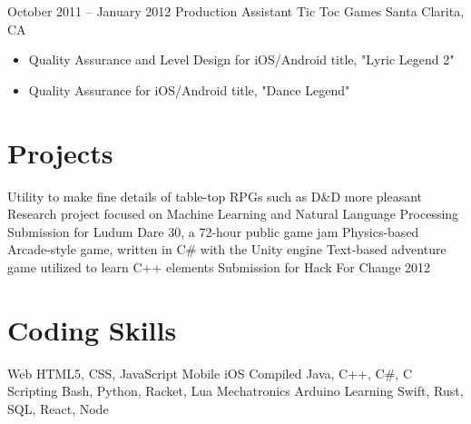 \documentclass[11pt,a4paper,sans]{moderncv}        %
\begin{document}
\cventry
{October 2011 -- January 2012}	{Production Assistant}
{Tic Toc Games}	{Santa Clarita, CA}
{}
{
  \begin{itemize}
  \item Quality Assurance and Level Design for iOS/Android title, "Lyric Legend 2"
  \item Quality Assurance for iOS/Android title, "Dance Legend"
  \end{itemize}
}	%

\section{Projects}		%
             {Utility to make fine details of table-top RPGs such as D\&D more pleasant}
			{Research project focused on Machine Learning and Natural Language Processing}
			{Submission for Ludum Dare 30, a 72-hour public game jam}
                         {Physics-based Arcade-style game, written in C\# with the Unity engine}
			{Text-based adventure game utilized to learn C++ elements}
	        {Submission for Hack For Change 2012}

\section{Coding Skills}	%
\cvdoubleitem
{Web}	                {HTML5, CSS, JavaScript}
{Mobile}	        {iOS}
\cvdoubleitem
{Compiled}	        {Java, C++, C\#, C}
{Scripting}		{Bash, Python, Racket, Lua}
\cvdoubleitem
{Mechatronics}	        {Arduino}
{Learning}		{Swift, Rust, SQL, React, Node}
\end{document}
